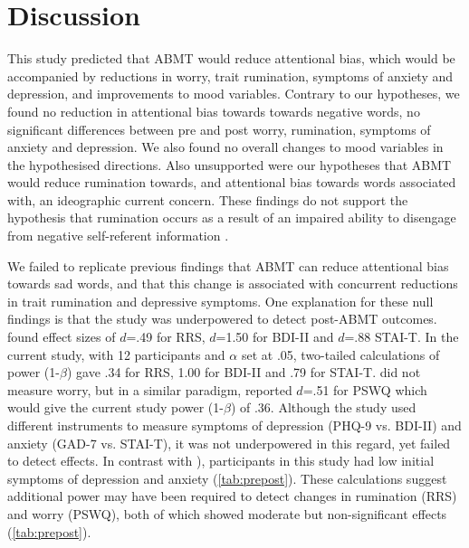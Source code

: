 \documentclass[man,floatsintext,a4paper,biblatex]{apa6}\usepackage[]{graphicx}\usepackage[]{color}
\begin{document}
\setlength\tabcolsep{1mm}







\clearpage
\section{Discussion}

This study predicted that ABMT would reduce attentional bias, which
would be accompanied by reductions in worry, trait rumination, symptoms
of anxiety and depression, and improvements to mood variables. Contrary
to our hypotheses, we found no reduction in attentional bias towards
towards negative words, no significant differences between pre and post
worry, rumination, symptoms of anxiety and depression. We also found no
overall changes to mood variables in the hypothesised directions. Also
unsupported were our hypotheses that ABMT would reduce rumination towards,
and attentional bias towards words associated with, an ideographic
current concern. These findings do not support the hypothesis that
rumination occurs as a result of an impaired ability to disengage from
negative self-referent information \parencite{koster_understanding_2011}.



We failed to replicate previous findings \parencite{yang_attention_2015}
that ABMT can reduce attentional bias towards sad words, and that
this change is associated with concurrent reductions in trait
rumination and depressive symptoms. One explanation for these null
findings is that the study was underpowered to detect post-ABMT
outcomes. \textcite{yang_attention_2015} found effect sizes of ${d}$=.49
for RRS, ${d}$=1.50 for BDI-II and ${d}$=.88 STAI-T. In the current study,
with 12 participants and $\alpha$ set at .05, two-tailed calculations of
power (1-$\beta$) gave .34 for RRS, 1.00 for BDI-II
and .79 for STAI-T. \textcite{yang_attention_2015} did not
measure worry, but in a similar paradigm, \textcite{enock_attention_2014}
reported ${d}$=.51 for PSWQ which would give the current study
power (1-$\beta$) of .36. Although the study used
different instruments to measure symptoms of depression (PHQ-9
vs. BDI-II) and anxiety (GAD-7 vs. STAI-T), it was not underpowered
in this regard, yet failed to detect effects. In contrast with
\textcite{yang_attention_2015}), participants in this study had low
initial symptoms of depression and anxiety (\cref{tab:prepost}). These
calculations suggest additional power may have been required to detect
changes in rumination (RRS) and worry (PSWQ), both of which showed
moderate but non-significant effects (\cref{tab:prepost}).
\end{document}
